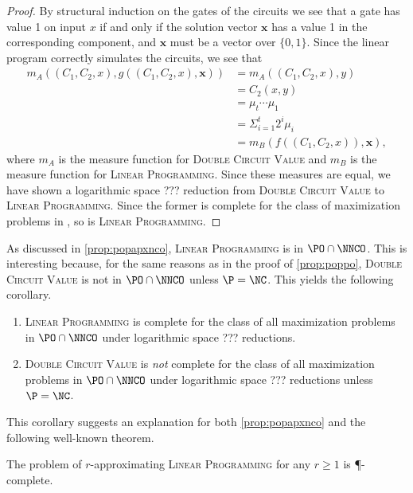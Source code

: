 \documentclass[]{article}
\begin{document}
\begin{proof}
  By structural induction on the gates of the circuits we see that a gate has value 1 on input $x$ if and only if the solution vector $\mathbf{x}$ has a value 1 in the corresponding component, and $\mathbf{x}$ must be a vector over $\{0, 1\}$.
  Since the linear program correctly simulates the circuits, we see that
  \begin{align*}
    m_A((C_1, C_2, x), g((C_1, C_2, x), \mathbf{x})) & = m_A((C_1, C_2, x), y) \\
    & = C_2(x, y) \\
    & = \mu_t \dotsb \mu_1 \\
    & = \Sigma^t_{i = 1} 2^i \mu_i \\
    & = m_B(f((C_1, C_2, x)), \mathbf{x}),
  \end{align*}
  where $m_A$ is the measure function for \textsc{Double Circuit Value} and $m_B$ is the measure function for \textsc{Linear Programming}.
  Since these measures are equal, we have shown a logarithmic space ??? reduction from \textsc{Double Circuit Value} to \textsc{Linear Programming}.
  Since the former is complete for the class of maximization problems in \PO, so is \textsc{Linear Programming}.
\end{proof}

As discussed in \autoref{prop:popapxnco}, \textsc{Linear Programming} is in $\PO \cap \NNCO$.
This is interesting because, for the same reasons as in the proof of \autoref{prop:poppo}, \textsc{Double Circuit Value} is not in $\PO \cap \NNCO$ unless $\P = \NC$.
This yields the following corollary.

\begin{corollary}\label{cor:lpishard}
  \mbox{}
  \begin{enumerate}
  \item \textsc{Linear Programming} is complete for the class of all maximization problems in $\PO \cap \NNCO$ under logarithmic space ??? reductions.
  \item \textsc{Double Circuit Value} is \emph{not} complete for the class of all maximization problems in $\PO \cap \NNCO$ under logarithmic space ??? reductions unless $\P = \NC$.
  \end{enumerate}
\end{corollary}

This corollary suggests an explanation for both \autoref{prop:popapxnco} and the following well-known theorem.

\begin{theorem}
  The problem of $r$-approximating \textsc{Linear Programming} for any $r \geq 1$ is \P-complete.
\end{theorem}
\end{document}

